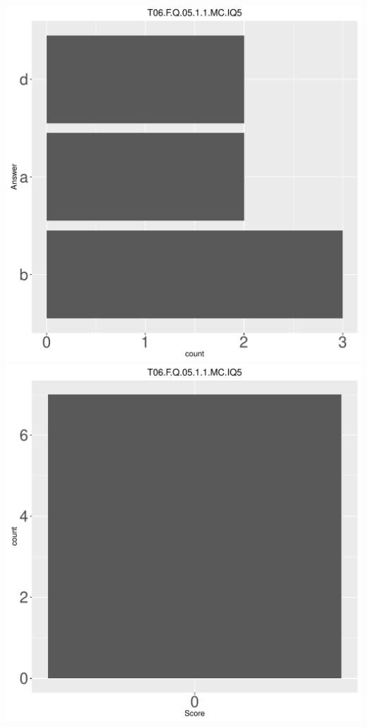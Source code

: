 \documentclass[12pt,english,nohyper]{tufte-handout}\usepackage[]{graphicx}\usepackage[]{color}
\begin{document}
\begin{center} \includegraphics[width=.45\linewidth]{Topic06_AB_67_answer} \includegraphics[width=.45\linewidth]{Topic06_AB_67_score} \end{center} 
\end{document}
